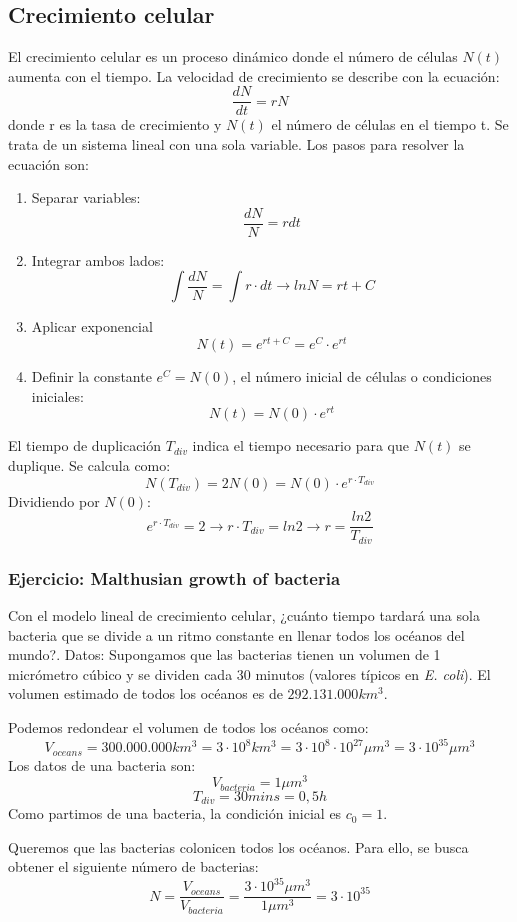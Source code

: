\subsection{Crecimiento celular}
El crecimiento celular es un proceso dinámico donde el número de células $N(t)$ aumenta con el tiempo. La velocidad de crecimiento se describe con la ecuación:
$$\frac{dN}{dt} = rN$$
donde r es la tasa de crecimiento y $N(t)$ el número de células en el tiempo t. Se trata de un sistema lineal con una sola variable. Los pasos para resolver la ecuación son:
\begin{enumerate}
\item Separar variables:
$$\frac{dN}{N} = r dt$$
\item Integrar ambos lados:
$$\int \frac{dN}{N} = \int r \cdot dt \rightarrow ln N = r t + C$$
\item Aplicar exponencial
$$N(t) = e^{rt + C} = e^C \cdot e^{rt}$$
\item Definir la constante $e^C = N(0)$, el número inicial de células o condiciones iniciales:
$$N(t) = N(0) \cdot e^{rt}$$
\end{enumerate}

El tiempo de duplicación $T_{div}$ indica el tiempo necesario para que $N(t)$ se duplique. Se calcula como:
$$N(T_{div}) = 2N(0) = N(0) \cdot e^{r \cdot T_{div}}$$
Dividiendo por $N(0)$:
$$ e^{r \cdot T_{div}} = 2 \rightarrow r \cdot T_{div} = ln 2 \rightarrow r = \frac{ln 2}{T_{div}}$$

\subsubsection{Ejercicio: Malthusian growth of bacteria}
Con el modelo lineal de crecimiento celular, ¿cuánto tiempo tardará una sola bacteria que se divide a un ritmo constante en llenar todos los océanos del mundo?. Datos: Supongamos que las bacterias tienen un volumen de 1 micrómetro cúbico y se dividen cada 30 minutos (valores típicos en \textit{E. coli}). El volumen estimado de todos los océanos es de $292.131.000 km^3$.

Podemos redondear el volumen de todos los océanos como:
$$V_{oceans} = 300.000.000 km^3 = 3 \cdot 10^8 km^3 = 3 \cdot 10^8 \cdot 10^{27} \mu m^3 = 3 \cdot 10^{35} \mu m^3$$
Los datos de una bacteria son:
$$V_{bacteria} = 1 \mu m^3$$
$$T_{div} = 30 mins = 0,5 h$$
Como partimos de una bacteria, la condición inicial es $c_0 = 1$.

Queremos que las bacterias colonicen todos los océanos. Para ello, se busca obtener el siguiente número de bacterias:
$$N = \frac{V_{oceans}}{V_{bacteria}} = \frac{3 \cdot 10^{35} \mu m^3}{1 \mu m^3} = 3 \cdot 10^{35}$$

